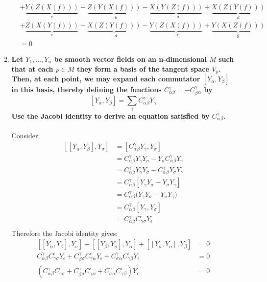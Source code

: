 \documentclass[9pt]{report}
\begin{document}
\begin{enumerate}
\begin{enumerate}
\[\begin{align}
                   &+ \underbrace{Y(Z(X(f)))}_c-\underbrace{Z(Y(X(f)))}_{-b}-\underbrace{X(Y(Z(f)))}_{-a}+\underbrace{X(Z(Y(f)))}_d \\
                   &+ \underbrace{Z(X(Y(f)))}_e-\underbrace{X(Z(Y(f)))}_{-d}-\underbrace{Y(Z(X(f)))}_{-c}+\underbrace{Y(X(Z(f)))}_g \\
                   &= 0
    \end{align}
  \]
\item \textbf{Let $Y_1,\ldots,Y_n$ be smooth vector fields on an n-dimensional
  $M$ such that at each $p\in M$ they form a basis of the tangent space $V_p$.
Then, at each point, we may expand each commutator $[Y_\alpha, Y_\beta]$ in
this basis, thereby defining the functions $C^\gamma_\alpha_\beta=-C^\gamma_\beta_\alpha$ by}
\[
  [Y_\alpha, Y_\beta] = \sum_\gamma C^\gamma_\alpha_\beta Y_\gamma
\]
  \textbf{Use the Jacobi identity to derive an equation satisfied by $C^\gamma_\alpha_\beta$.}\\\\
  Consider:
  \[
    \begin{align*}
      [[Y_\alpha, Y_\beta], Y_\sigma] &= [C^\gamma_\alpha_\beta Y_\gamma,Y_\sigma]\\
    &= C^\gamma_\alpha_\beta Y_\gamma Y_\sigma - Y_\sigma C^\gamma_\alpha_\beta Y_\gamma \\
    &= C^\gamma_\alpha_\beta Y_\gamma Y_\sigma - C^\gamma_\alpha_\beta Y_\sigma Y_\gamma \\
    &= C^\gamma_\alpha_\beta [Y_\gamma Y_\sigma - Y_\sigma Y_\gamma] \\
    &= C^\gamma_\alpha_\beta \Big(Y_\gamma Y_\sigma - Y_\sigma Y_\gamma\Big) \\
    &= C^\gamma_\alpha_\beta [Y_\gamma, Y_\sigma] \\
    &= C^\gamma_\alpha_\beta C^\epsilon_\gamma_\sigma Y_\epsilon \\
    \end{align*}
  \]
  Therefore the Jacobi identity gives:
  \[
  \begin{align*}
    [[Y_\alpha, Y_\beta],Y_\sigma]+[[Y_\beta, Y_\sigma],Y_\alpha]+[[Y_\sigma, Y_\alpha],Y_\beta] &= 0 \\
    C^\gamma_\alpha_\beta C^\epsilon_\gamma_\sigma Y_\epsilon
    + C^\gamma_\beta_\sigma C^\epsilon_\gamma_\alpha Y_\epsilon + C^\gamma_\sigma_\alpha C^\epsilon_\gamma_\beta Y_\epsilon &=0 \\
    (C^\gamma_\alpha_\beta C^\epsilon_\gamma_\sigma+ C^\gamma_\beta_\sigma C^\epsilon_\gamma_\alpha + C^\gamma_\sigma_\alpha C^\epsilon_\gamma_\beta) Y_\epsilon &=0 \\

\end{align*}\]
\end{enumerate}
\end{enumerate}
\end{document}
